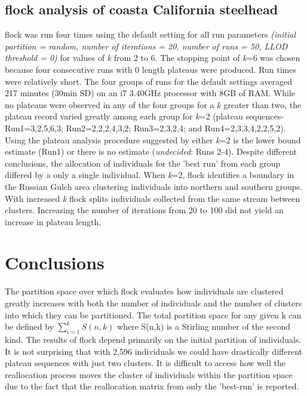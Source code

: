 \subsection*{{\sc flock} analysis of coasta California steelhead} 
{\sc flock} was run four times using the default setting for all run parameters \textit{(initial partition = random, number of iterations = 20, number of runs = 50, LLOD threshold = 0)} for values of \textit{k} from 2 to 6. The stopping point of \textit{k}=6 was chosen because four consecutive runs with 0 length plateaus were produced. 
Run times were relatively short. The four groups of runs for the default settings averaged 217 minutes (30min SD) on an i7 3.40GHz processor with 8GB of RAM. While no plateaus were observed in any of the four groups for a \textit{k} greater than two, the plateau record varied greatly among each group for \textit{k}=2 (plateau sequences- Run1=3,2,5,6,3; Run2=2,2,2,4,3,2; Run3=2,3,2,4; and Run4=2,3,3,4,2,2,5,2). Using the plateau analysis procedure suggested by \citet{Duc&Tur2012} either \textit{k}=2 is the lower bound estimate (Run1) or there is no estimate (\textit{undecided}: Runs 2-4). Despite different conclusions, the allocation of individuals for the 'best run' from each group differed by a only a single individual. When \textit{k}=2, {\sc flock} identifies a boundary in the Russian Gulch area clustering individuals into northern and southern groups. With increased \textit{k} {\sc flock} splits individuals collected from the same stream between clusters. Increasing the number of iterations from 20 to 100 did not yield an increase in plateau length. 


\section*{Conclusions}
The partition space over which {\sc flock} evaluates how individuals are clustered greatly increases with both the number of individuals and the number of clusters into which they can be partitioned. The total partition space for any given k can be defined by $\sum\limits_{i=1}^k S(n,k)$ where S(n,k) is a Stirling number of the second kind. The results of {\sc flock} depend primarily on the initial partition of individuals. It is not surprising that with 2,596 individuals we could have drastically different plateau sequences with just two clusters. It is difficult to access how well the reallocation process moves the cluster of individuals within the partition space due to the fact that the reallocation matrix from only the 'best-run' is reported. 
